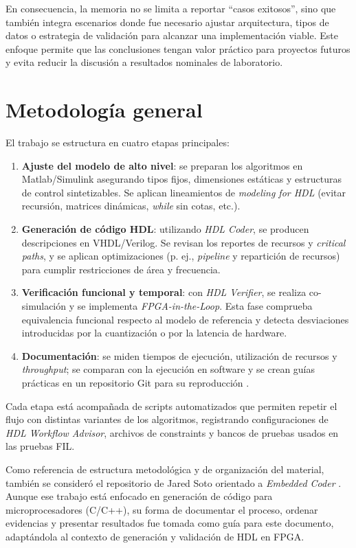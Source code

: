 En consecuencia, la memoria no se limita a reportar ``casos exitosos'', sino que también integra escenarios donde fue necesario ajustar arquitectura, tipos de datos o estrategia de validación para alcanzar una implementación viable. Este enfoque permite que las conclusiones tengan valor práctico para proyectos futuros y evita reducir la discusión a resultados nominales de laboratorio.

\section{Metodología general}

El trabajo se estructura en cuatro etapas principales:

\begin{enumerate}
    \item \textbf{Ajuste del modelo de alto nivel}: se preparan los algoritmos en Matlab/Simulink asegurando tipos fijos, dimensiones estáticas y estructuras de control sintetizables. Se aplican lineamientos de \textit{modeling for HDL} (evitar recursión, matrices dinámicas, \textit{while} sin cotas, etc.).
    \item \textbf{Generación de código HDL}: utilizando \textit{HDL Coder}, se producen descripciones en VHDL/Verilog. Se revisan los reportes de recursos y \textit{critical paths}, y se aplican optimizaciones (p. ej., \textit{pipeline} y repartición de recursos) para cumplir restricciones de área y frecuencia.
    \item \textbf{Verificación funcional y temporal}: con \textit{HDL Verifier}, se realiza co-simulación y se implementa \textit{FPGA-in-the-Loop}. Esta fase comprueba equivalencia funcional respecto al modelo de referencia y detecta desviaciones introducidas por la cuantización o por la latencia de hardware.
    \item \textbf{Documentación}: se miden tiempos de ejecución, utilización de recursos y \textit{throughput}; se comparan con la ejecución en software y se crean guías prácticas en un repositorio Git para su reproducción \cite{pidawRepo}.
\end{enumerate}

Cada etapa está acompañada de scripts automatizados que permiten repetir el flujo con distintas variantes de los algoritmos, registrando configuraciones de \textit{HDL Workflow Advisor}, archivos de constraints y bancos de pruebas usados en las pruebas FIL.

Como referencia de estructura metodológica y de organización del material, también se consideró el repositorio de Jared Soto orientado a \textit{Embedded Coder} \cite{jaredEmbeddedRepo}. Aunque ese trabajo está enfocado en generación de código para microprocesadores (C/C++), su forma de documentar el proceso, ordenar evidencias y presentar resultados fue tomada como guía para este documento, adaptándola al contexto de generación y validación de HDL en FPGA.

